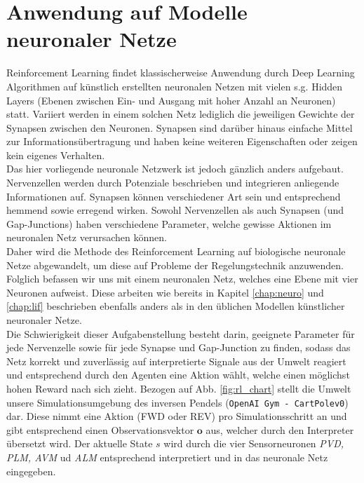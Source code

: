 \section{Anwendung auf Modelle neuronaler Netze}
\label{sec:rl_neuro}
	Reinforcement Learning findet klassischerweise Anwendung durch Deep Learning Algorithmen auf künstlich erstellten neuronalen Netzen mit vielen s.g. \glqq Hidden Layers\grqq{} (Ebenen zwischen Ein- und Ausgang mit hoher Anzahl an Neuronen) statt. Variiert werden in einem solchen Netz lediglich die jeweiligen Gewichte der Synapsen zwischen den Neuronen. Synapsen sind darüber hinaus einfache Mittel zur Informationsübertragung und haben keine weiteren Eigenschaften oder zeigen kein eigenes Verhalten.\\
	Das hier vorliegende neuronale Netzwerk ist jedoch gänzlich anders aufgebaut. Nervenzellen werden durch Potenziale beschrieben und integrieren anliegende Informationen auf. Synapsen können verschiedener Art sein und entsprechend hemmend sowie erregend wirken. Sowohl Nervenzellen als auch Synapsen (und Gap-Junctions) haben verschiedene Parameter, welche gewisse Aktionen im neuronalen Netz verursachen können.\\
	Daher wird die Methode des Reinforcement Learning auf biologische neuronale Netze abgewandelt, um diese auf Probleme der Regelungstechnik anzuwenden. Folglich befassen wir uns mit einem neuronalen Netz, welches eine Ebene mit vier Neuronen aufweist. Diese  arbeiten wie bereits in Kapitel \ref{chap:neuro} und \ref{chap:lif} beschrieben ebenfalls anders als in den üblichen Modellen künstlicher neuronaler Netze.\\
	Die Schwierigkeit dieser Aufgabenstellung besteht darin, geeignete Parameter für jede Nervenzelle sowie für jede Synapse und Gap-Junction zu finden, sodass das Netz korrekt und zuverlässig auf interpretierte Signale aus der Umwelt reagiert und entsprechend durch den Agenten eine Aktion wählt, welche einen möglichst hohen Reward nach sich zieht. Bezogen auf Abb. \ref{fig:rl_chart} stellt die Umwelt unsere Simulationsumgebung des inversen Pendels (\texttt{OpenAI Gym - CartPolev0}) dar. Diese nimmt eine Aktion (FWD oder REV) pro Simulationsschritt an und gibt entsprechend einen Observationsvektor $\textbf{o}$ aus, welcher durch den Interpreter übersetzt wird. Der aktuelle State $s$ wird durch die vier Sensorneuronen \textit{PVD, PLM, AVM} ud \textit{ALM} entsprechend interpretiert und in das neuronale Netz eingegeben.

